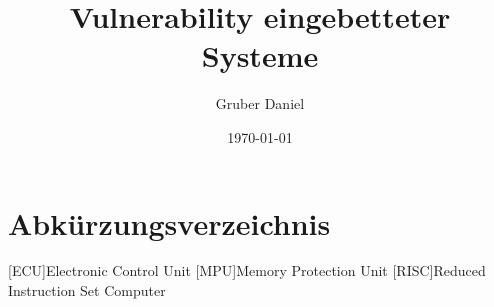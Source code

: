 \documentclass[a4paper,
DIV=13,
12pt,
BCOR=10mm,
department=FakIM,
oneside,
parskip=half,
automark,
listof=totocnumbered,
bibliography=totocnumbered,
acronym=totocnumbered
] {OTHRartcl}
\date{\today}
\title{Vulnerability eingebetteter Systeme}
\author{Gruber Daniel}
\begin{document}
\maketitle

\tableofcontents
\newpage

\section*{Abkürzungsverzeichnis}
\label{abkuerzungsverzeichnis}
\begin{acronym}[AUTOSAR]
  [ECU]{Electronic Control Unit}
  [MPU]{Memory Protection Unit}
  [RISC]{Reduced Instruction Set Computer}
\end{acronym}
\newpage

\end{document}
